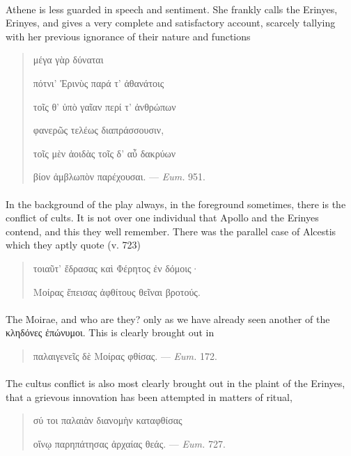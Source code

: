 \documentclass[a4paper, 11pt, oneside, polutonikogreek, english]{article}
\begin{document}
\paragraph{}
Athene is less guarded in speech and sentiment. She frankly calls the Erinyes, Erinyes, and gives a very complete and satisfactory account, scarcely tallying with her previous ignorance of their nature and functions
\begin{quotation}
\hspace*{20mm}μέγα γὰρ δύναται

πότνι' Ἐρινὺς παρά τ' ἀθανάτοις

τοῖς θ' ὑπὸ γαῖαν περί τ' ἀνθρώπων

φανερῶς τελέως διαπράσσουσιν,

τοῖς μὲν ἀοιδὰς τοῖς δ' αὖ δακρύων

βίον ἀμβλωπὸν παρέχουσαι. --- \emph{Eum.} 951.
\end{quotation}
\paragraph{}
In the background of the play always, in the foreground sometimes, there is the conflict of cults. It is not over one individual that Apollo and the Erinyes contend, and this they well remember. There was the parallel case of Alcestis which they aptly quote (v. 723)
\begin{quotation}
τοιαῦτ' ἔδρασας καὶ Φέρητος ἐν δόμοις·

Μοίρας ἔπεισας ἀφθίτους θεῖναι βροτούς.
\end{quotation}
\paragraph{}
The Moirae, and who are they? only as we have already seen another of the κληδόνες ἐπώνυμοι. This is clearly brought out in
\begin{quotation}
παλαιγενεῖς δὲ Μοίρας φθίσας. --- \emph{Eum.} 172.
\end{quotation}
\paragraph{}
The cultus conflict is also most clearly brought out in the plaint of the Erinyes, that a grievous innovation has been attempted in matters of ritual,
\begin{quotation}
σύ τοι παλαιὰν διανομὴν καταφθίσας

οἴνῳ παρηπάτησας ἀρχαίας θεάς. --- \emph{Eum.} 727.
\end{quotation}
\end{document}
